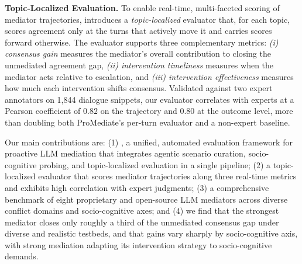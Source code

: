 \smallskip\smallskip
\noindent\textbf{Topic-Localized Evaluation.} To enable real-time, multi-faceted scoring of mediator trajectories, \algname{} introduces a \emph{topic-localized} evaluator that, for each topic, scores agreement only at the turns that actively move it and carries scores forward otherwise. The evaluator supports three complementary metrics: \emph{(i) consensus gain} measures the mediator's overall contribution to closing the unmediated agreement gap, \emph{(ii) intervention timeliness} measures when the mediator acts relative to escalation, and \emph{(iii) intervention effectiveness} measures how much each intervention shifts consensus. Validated against two expert annotators on 1,844 dialogue snippets, our evaluator correlates with experts at a Pearson coefficient of $0.82$ on the trajectory and $0.80$ at the outcome level, more than doubling both ProMediate's per-turn evaluator \citep{liu2025promediate} and a non-expert baseline.

Our main contributions are: (1) \algname{}, a unified, automated evaluation framework for proactive LLM mediation that integrates agentic scenario curation, socio-cognitive probing, and topic-localized evaluation in a single pipeline; (2) a topic-localized evaluator that scores mediator trajectories along three real-time metrics and exhibits high correlation with expert judgments; (3) a comprehensive benchmark of eight proprietary and open-source LLM mediators across diverse conflict domains and socio-cognitive axes; and (4)  we find that the strongest mediator closes only roughly a third of the unmediated consensus gap under diverse and realistic testbeds, and that gains vary sharply by socio-cognitive axis, with strong mediation adapting its intervention strategy to socio-cognitive demands.










